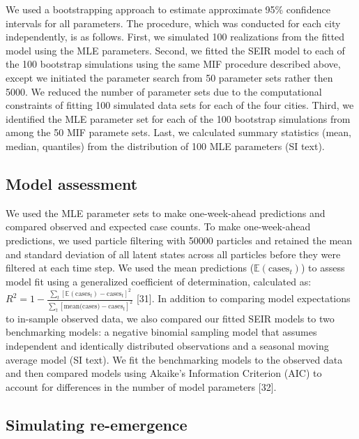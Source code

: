 \documentclass[3p]{elsarticle} %
\begin{document}
We used a bootstrapping approach to estimate approximate 95\% confidence
intervals for all parameters. The procedure, which was conducted for
each city independently, is as follows. First, we simulated 100
realizations from the fitted model using the MLE parameters. Second, we
fitted the SEIR model to each of the 100 bootstrap simulations using the
same MIF procedure described above, except we initiated the parameter
search from 50 parameter sets rather then 5000. We reduced the number of
parameter sets due to the computational constraints of fitting 100
simulated data sets for each of the four cities. Third, we identified
the MLE parameter set for each of the 100 bootstrap simulations from
among the 50 MIF paramete sets. Last, we calculated summary statistics
(mean, median, quantiles) from the distribution of 100 MLE parameters
(SI text).

\hypertarget{model-assessment}{%
\subsection{Model assessment}\label{model-assessment}}

We used the MLE parameter sets to make one-week-ahead predictions and
compared observed and expected case counts. To make one-week-ahead
predictions, we used particle filtering with 50000 particles and
retained the mean and standard deviation of all latent states across all
particles before they were filtered at each time step. We used the mean
predictions (\(\mathbb{E}(\text{cases}_t)\)) to assess model fit using a
generalized coefficient of determination, calculated as:
\(R^2 = 1 - \frac{\sum_t [\mathbb{E}(\text{cases}_t) - \text{cases}_t]^2}{\sum_t [\text{mean(cases)}-\text{cases}_t]^2}\)
{[}31{]}. In addition to comparing model expectations to in-sample
observed data, we also compared our fitted SEIR models to two
benchmarking models: a negative binomial sampling model that assumes
independent and identically distributed observations and a seasonal
moving average model (SI text). We fit the benchmarking models to the
observed data and then compared models using Akaike's Information
Criterion (AIC) to account for differences in the number of model
parameters {[}32{]}.

\hypertarget{simulating-re-emergence}{%
\subsection{Simulating re-emergence}\label{simulating-re-emergence}}
\end{document}
